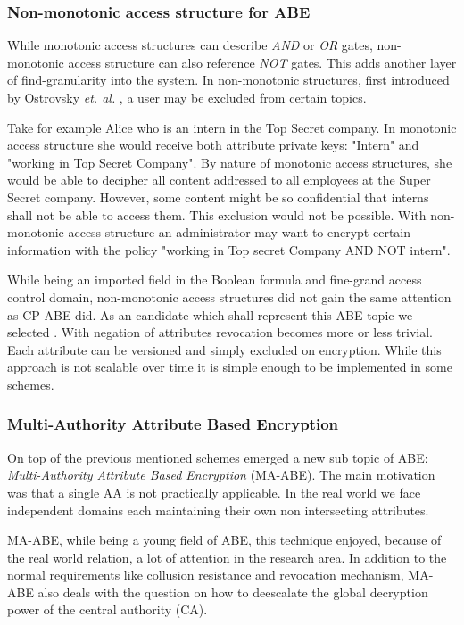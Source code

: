 \subsubsection{Non-monotonic access structure for \ac{ABE}}
While monotonic access structures can describe \textit{AND} or \textit{OR} gates, non-monotonic access structure can also reference \textit{NOT} gates. This adds another layer of find-granularity into the system. In non-monotonic structures, first introduced by Ostrovsky \textit{et. al.} \cite{Ostrovsky:2007:AEN:1315245.1315270}, a user may be excluded from certain topics. 

Take for example Alice who is an intern in the Top Secret company. In monotonic access structure she would receive both attribute private keys: "Intern" and "working in Top Secret Company". By nature of monotonic access structures, she would be able to decipher all content addressed to all employees at the Super Secret company. However, some content might be so confidential that interns shall not be able to access them. This exclusion would not be possible. With non-monotonic access structure an administrator may want to encrypt certain information with the policy "working in Top secret Company AND NOT intern".  

While being an imported field in the Boolean formula and fine-grand access control domain, non-monotonic access structures did not gain the same attention as \ac{CP-ABE} did. As an candidate which shall represent this \ac{ABE} topic we selected \cite{10.1007/978-3-642-54631-0_16}. With negation of attributes revocation becomes more or less trivial. Each attribute can be versioned and simply excluded on encryption. While this approach is not scalable over time it is simple enough to be implemented in some schemes.   

\subsubsection{Multi-Authority Attribute Based Encryption}
On top of the previous mentioned schemes emerged a new sub topic of \ac{ABE}: \textit{Multi-Authority Attribute Based Encryption} (\ac{MA-ABE}). The main motivation was that a single \ac{AA} is not practically applicable. In the real world we face independent domains each maintaining their own non intersecting attributes. 

\ac{MA-ABE}, while being a young field of \ac{ABE}, this technique enjoyed, because of the real world relation, a lot of attention in the research area. In addition to the normal requirements like collusion resistance and revocation mechanism, \ac{MA-ABE} also deals with the question on how to deescalate the global decryption power of the central authority (\ac{CA}). 

